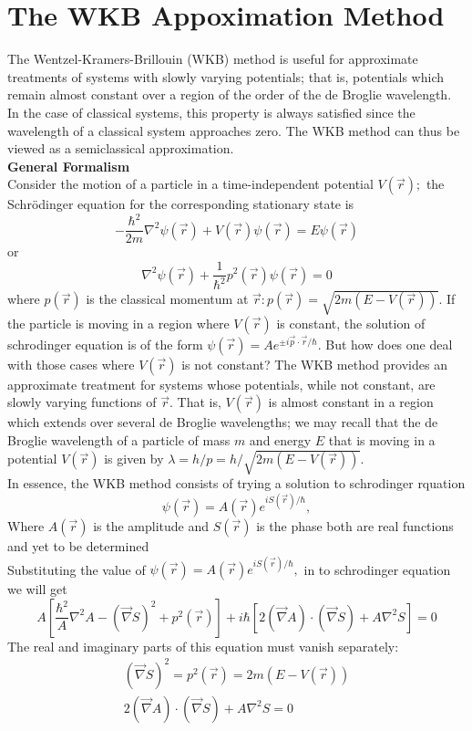 \section{The WKB Appoximation Method}
The Wentzel-Kramers-Brillouin (WKB) method is useful for approximate treatments of systems with slowly varying potentials; that is, potentials which remain almost constant over a region of the order of the de Broglie wavelength. In the case of classical systems, this property is always satisfied since the wavelength of a classical system approaches zero. The WKB method can thus be viewed as a semiclassical approximation.\\
\textbf{General Formalism}\\
Consider the motion of a particle in a time-independent potential $V(\vec{r}) ;$ the Schrödinger equation for the corresponding stationary state is
$$
-\frac{\hbar^{2}}{2 m} \nabla^{2} \psi(\vec{r})+V(\vec{r}) \psi(\vec{r})=E \psi(\vec{r})
$$
or
$$
\nabla^{2} \psi(\vec{r})+\frac{1}{\hbar^{2}} p^{2}(\vec{r}) \psi(\vec{r})=0
$$
where $p(\vec{r})$ is the classical momentum at $\vec{r}: p(\vec{r})=\sqrt{2 m(E-V(\vec{r}))}$. If the particle is moving in a region where $V(\vec{r})$ is constant, the solution of schrodinger equation is of the form $\psi(\vec{r})=A e^{\pm i \vec{p} \cdot \vec{r} / \hbar} .$ But how does one deal with those cases where $V(\vec{r})$ is not constant? The WKB method provides an approximate treatment for systems whose potentials, while not constant, are slowly varying functions of $\vec{r}$. That is, $V(\vec{r})$ is almost constant in a region which extends over several de Broglie wavelengths; we may recall that the de Broglie wavelength of a particle of mass $m$ and energy $E$ that is moving in a potential $V(\vec{r})$ is given by $\lambda=h / p=h / \sqrt{2 m(E-V(\vec{r}))}$.\\
In essence, the WKB method consists of trying a solution to schrodinger rquation
$$
\psi(\vec{r})=A(\vec{r}) e^{i S(\vec{r}) / \hbar},
$$
Where $A(\vec{r})$ is the amplitude and $S(\vec{r})$ is the phase both are real functions and yet to be determined\\
Substituting the value of $
\psi(\vec{r})=A(\vec{r}) e^{i S(\vec{r}) / \hbar},
$ in to schrodinger equation we will get\\
$$A\left[\frac{\hbar^{2}}{A} \nabla^{2} A-(\vec{\nabla} S)^{2}+p^{2}(\vec{r})\right]+i \hbar\left[2(\vec{\nabla} A) \cdot(\vec{\nabla} S)+A \nabla^{2} S\right]=0$$
The real and imaginary parts of this equation must vanish separately:
$$
\begin{gathered}
(\vec{\nabla} S)^{2}=p^{2}(\vec{r})=2 m(E-V(\vec{r})) \\
2(\vec{\nabla} A) \cdot(\vec{\nabla} S)+A \nabla^{2} S=0
\end{gathered}
$$
